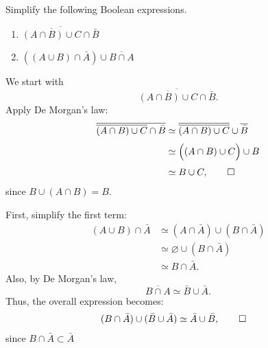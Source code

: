 \begin{hwkProblem}{4}{}

	Simplify the following Boolean expressions.
	\begin{enumerate}
		\item \(\overline{\overline{(A \cap B) \cup C} \cap \bar{B}}\)
		\item \(((A \cup B) \cap \bar{A}) \cup \overline{B \cap A}\)
	\end{enumerate}

	\hwkSol

	\hwkPart

	We start with
	\[
		\overline{\overline{(A \cap B) \cup C} \cap \bar{B}}.
	\]
	Apply De Morgan's law:
	\begin{align*}
		\overline{\overline{(A \cap B) \cup C} \cap \bar{B}} 
		&\simeq \overline{\overline{(A \cap B) \cup C}} \cup \overline{\bar{B}}\\[1mm]
		&\simeq \Bigl((A \cap B) \cup C\Bigr) \cup B\\[1mm]
		&\simeq B \cup C, \qed
	\end{align*}
	since \(B\cup (A\cap B)=B\).

	\hwkPart

	First, simplify the first term:
	\begin{align*}
		(A \cup B) \cap \bar{A} 
		&\simeq (A \cap \bar{A}) \cup (B \cap \bar{A})\\[1mm]
		&\simeq \varnothing \cup (B \cap \bar{A})\\[1mm]
		&\simeq B \cap \bar{A}.
	\end{align*}
	Also, by De Morgan's law,
	\[
		\overline{B \cap A} \simeq \bar{B} \cup \bar{A}.
	\]
	Thus, the overall expression becomes:
	\begin{align*}
		(B \cap \bar{A}) \cup (\bar{B} \cup \bar{A}) 
		&\simeq \bar{A} \cup \bar{B}, \qed
	\end{align*}
	since \(B \cap \bar{A}\subset \bar{A}\)

\end{hwkProblem}

